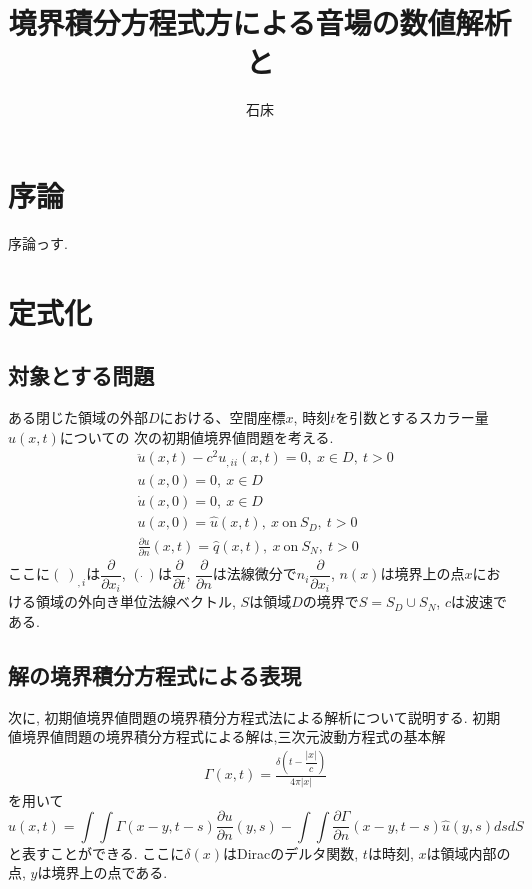 \documentclass[dvipdfmx]{ampbt}
\title{境界積分方程式方による音場の数値解析と}     %
      {移動する受音点におけるリアルタイム可聴化について}      %
      {}                                             %
\author{石床}{竜一}             %
\begin{document}
\ifoutputbody
\makeinsidecover                %
\makeabstract                   %
\maketoc                        %
\setcounter{page}{1}            %
\section{序論}
序論っす.%
\section{定式化}
\subsection{対象とする問題}
ある閉じた領域の外部$D$における、空間座標$x$, 時刻$t$を引数とするスカラー量$u(x,t)$についての
次の初期値境界値問題を考える.
\begin{align}
&\ddot{u}(x,t)-c^2 u_{,ii}(x,t)=0,\  x \in D,\ t>0 \\
&u(x,0)=0,\  x \in D \\
&\dot{u}(x,0)=0,\  x \in D \\
&u(x,0)=\hat{u}(x,t),\  x\  \mbox{on} \ S_D,\ t>0 \\
&\frac{\partial{u}}{\partial{n}} (x,t)=\hat{q}(x,t),\  x\  \mbox{on} \ S_N,\ t>0
\end{align}
ここに$(\ )_{,i}$は$\dfrac{\partial{}}{\partial{x_i}}$,
$(\dot{\ })$は$\dfrac{\partial{}}{\partial{t}}$,
$\dfrac{\partial{}}{\partial{n}}$は法線微分で$n_i \dfrac{\partial{}}{\partial{x_i}}$,
$n(x)$は境界上の点$x$における領域の外向き単位法線ベクトル,
$S$は領域$D$の境界で$S=S_D \cup S_N$,
$c$は波速である.

\subsection{解の境界積分方程式による表現}
次に, 初期値境界値問題の境界積分方程式法による解析について説明する.
初期値境界値問題の境界積分方程式による解は,三次元波動方程式の基本解
\begin{align}
&\Gamma(x,t) = \displaystyle \frac{\delta(t-\dfrac{|x|}{c})}{4\pi|x|}
\end{align}
を用いて
\begin{equation}
  \label{eq:境界積分方程式}
u(x,t) = \int\!\!\!\int \Gamma(x-y,t-s) \frac{\partial u}{\partial n}(y,s) - \int\!\!\!\int \frac{\partial \Gamma}{\partial n}(x-y,t-s) \hat{u}(y,s) ds dS
\end{equation}
と表すことができる.
ここに$\delta(x)$はDiracのデルタ関数,
$t$は時刻,
$x$は領域内部の点,
$y$は境界上の点である.
\end{document}
